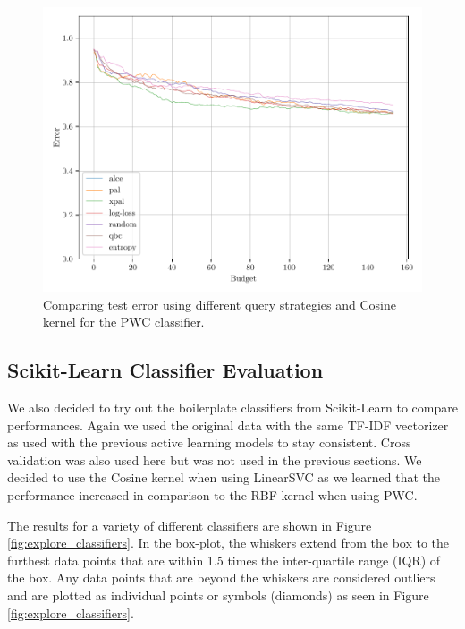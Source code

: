 \begin{figure}[ht]
    \centering
    \includegraphics[width=\textwidth]{../img/plot_kernel_cos_averaged_test_results.pdf}
    \caption{Comparing test error using different query strategies and Cosine kernel for the PWC classifier.}
    \label{fig:cos_avg_test_results}
\end{figure}


\subsection{Scikit-Learn Classifier Evaluation}

We also decided to try out the boilerplate classifiers from Scikit-Learn to compare performances. Again we used the original data with the same TF-IDF vectorizer as used with the previous active learning models to stay consistent. Cross validation was also used here but was not used in the previous sections. We decided to use the Cosine kernel when using LinearSVC as we learned that the performance increased in comparison to the RBF kernel when using PWC. 

The results for a variety of different classifiers are shown in Figure \ref{fig:explore_classifiers}. In the box-plot, the whiskers extend from the box to the furthest data points that are within 1.5 times the inter-quartile range (IQR) of the box. Any data points that are beyond the whiskers are considered outliers and are plotted as individual points or symbols (diamonds) as seen in Figure \ref{fig:explore_classifiers}.

